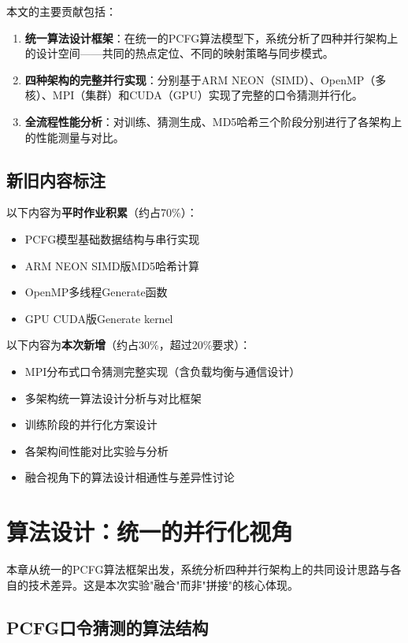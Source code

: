 \documentclass[12pt,a4paper]{ctexart}
\begin{document}
本文的主要贡献包括：

\begin{enumerate}[nosep]
    \item \textbf{统一算法设计框架}：在统一的PCFG算法模型下，系统分析了四种并行架构上的设计空间——共同的热点定位、不同的映射策略与同步模式。
    \item \textbf{四种架构的完整并行实现}：分别基于ARM NEON（SIMD）、OpenMP（多核）、MPI（集群）和CUDA（GPU）实现了完整的口令猜测并行化。
    \item \textbf{全流程性能分析}：对训练、猜测生成、MD5哈希三个阶段分别进行了各架构上的性能测量与对比。
\end{enumerate}

\subsection{新旧内容标注}

以下内容为\textbf{平时作业积累}（约占70\%）：
\begin{itemize}[nosep]
    \item PCFG模型基础数据结构与串行实现
    \item ARM NEON SIMD版MD5哈希计算
    \item OpenMP多线程Generate函数
    \item GPU CUDA版Generate kernel
\end{itemize}

以下内容为\textbf{本次新增}（约占30\%，超过20\%要求）：
\begin{itemize}[nosep]
    \item MPI分布式口令猜测完整实现（含负载均衡与通信设计）
    \item 多架构统一算法设计分析与对比框架
    \item 训练阶段的并行化方案设计
    \item 各架构间性能对比实验与分析
    \item 融合视角下的算法设计相通性与差异性讨论
\end{itemize}

\section{算法设计：统一的并行化视角}

本章从统一的PCFG算法框架出发，系统分析四种并行架构上的共同设计思路与各自的技术差异。这是本次实验"融合"而非"拼接"的核心体现。

\subsection{PCFG口令猜测的算法结构}
\end{document}
